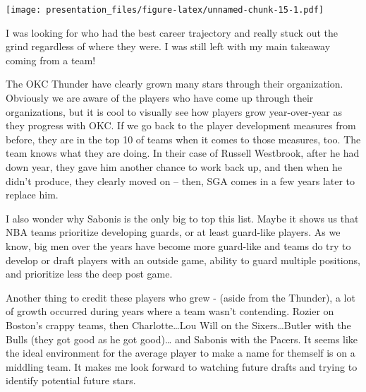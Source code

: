 \documentclass[
]{article}
\begin{document}
\texttt{[image: presentation\_files/figure-latex/unnamed-chunk-15-1.pdf]}

I was looking for who had the best career trajectory and really stuck
out the grind regardless of where they were. I was still left with my
main takeaway coming from a team!

The OKC Thunder have clearly grown many stars through their
organization. Obviously we are aware of the players who have come up
through their organizations, but it is cool to visually see how players
grow year-over-year as they progress with OKC. If we go back to the
player development measures from before, they are in the top 10 of teams
when it comes to those measures, too. The team knows what they are
doing. In their case of Russell Westbrook, after he had down year, they
gave him another chance to work back up, and then when he didn't
produce, they clearly moved on -- then, SGA comes in a few years later
to replace him.

I also wonder why Sabonis is the only big to top this list. Maybe it
shows us that NBA teams prioritize developing guards, or at least
guard-like players. As we know, big men over the years have become more
guard-like and teams do try to develop or draft players with an outside
game, ability to guard multiple positions, and prioritize less the deep
post game.

Another thing to credit these players who grew - (aside from the
Thunder), a lot of growth occurred during years where a team wasn't
contending. Rozier on Boston's crappy teams, then Charlotte\ldots Lou
Will on the Sixers\ldots Butler with the Bulls (they got good as he got
good)\ldots{} and Sabonis with the Pacers. It seems like the ideal
environment for the average player to make a name for themself is on a
middling team. It makes me look forward to watching future drafts and
trying to identify potential future stars.
\end{document}
